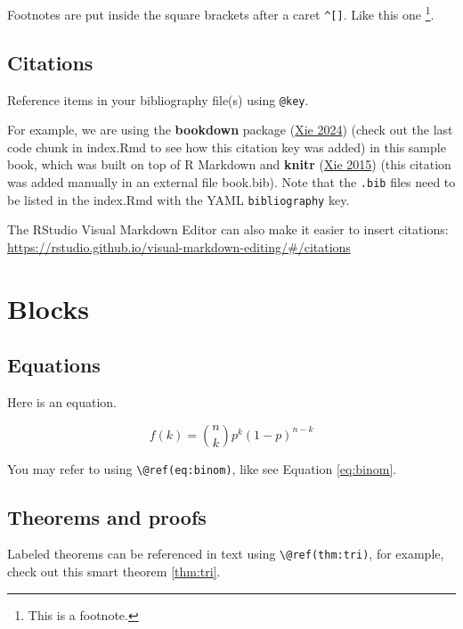 \documentclass[
]{book}
\theoremstyle{definition}
\theoremstyle{definition}
\theoremstyle{definition}
\theoremstyle{definition}
\theoremstyle{remark}
\begin{document}
Footnotes are put inside the square brackets after a caret \texttt{\^{}{[}{]}}. Like this one \footnote{This is a footnote.}.

\hypertarget{citations}{%
\section{Citations}\label{citations}}

Reference items in your bibliography file(s) using \texttt{@key}.

For example, we are using the \textbf{bookdown} package (\protect\hyperlink{ref-R-bookdown}{Xie 2024}) (check out the last code chunk in index.Rmd to see how this citation key was added) in this sample book, which was built on top of R Markdown and \textbf{knitr} (\protect\hyperlink{ref-xie2015}{Xie 2015}) (this citation was added manually in an external file book.bib).
Note that the \texttt{.bib} files need to be listed in the index.Rmd with the YAML \texttt{bibliography} key.

The RStudio Visual Markdown Editor can also make it easier to insert citations: \url{https://rstudio.github.io/visual-markdown-editing/\#/citations}

\hypertarget{blocks}{%
\chapter{Blocks}\label{blocks}}

\hypertarget{equations}{%
\section{Equations}\label{equations}}

Here is an equation.

\begin{equation} 
  f\left(k\right) = \binom{n}{k} p^k\left(1-p\right)^{n-k}
  \label{eq:binom}
\end{equation}

You may refer to using \texttt{\textbackslash{}@ref(eq:binom)}, like see Equation \eqref{eq:binom}.

\hypertarget{theorems-and-proofs}{%
\section{Theorems and proofs}\label{theorems-and-proofs}}

Labeled theorems can be referenced in text using \texttt{\textbackslash{}@ref(thm:tri)}, for example, check out this smart theorem \ref{thm:tri}.
\end{document}
